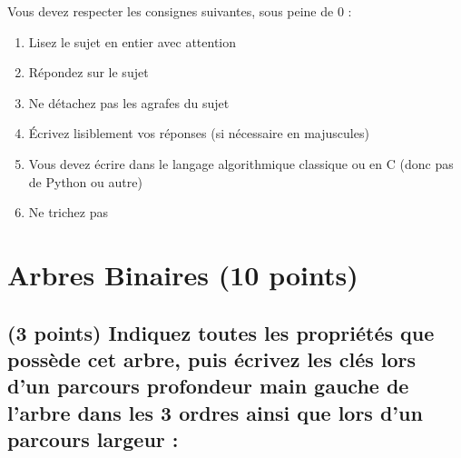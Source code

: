 \documentclass[11pt,a4paper]{article}
\begin{document}
\MakeExamTitle                   %


\bigskip

Vous devez respecter les consignes suivantes, sous peine de 0 :

\begin{enumerate}[label=\Roman*)]
\item Lisez le sujet en entier avec attention
\item Répondez sur le sujet
\item Ne détachez pas les agrafes du sujet
\item \'Ecrivez lisiblement vos réponses (si nécessaire en majuscules)
\item Vous devez écrire dans le langage algorithmique classique ou en C (donc pas de Python ou autre)
\item Ne trichez pas
\end{enumerate}


\vfillFirst

\section{Arbres Binaires (10 points)}

\subsection{(3 points) Indiquez toutes les propriétés que possède cet arbre, puis écrivez les clés lors d'un parcours profondeur main gauche de l'arbre dans les 3 ordres ainsi que lors d'un parcours largeur : }
\end{document}
